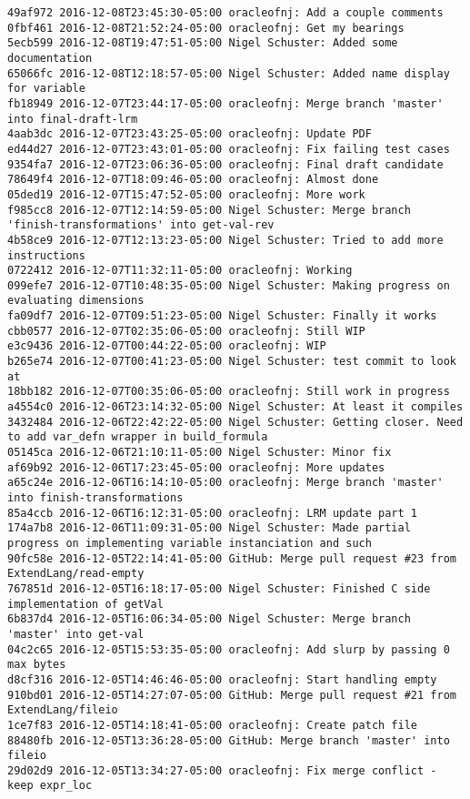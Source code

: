 \begin{lstlisting}
49af972 2016-12-08T23:45:30-05:00 oracleofnj: Add a couple comments
0fbf461 2016-12-08T21:52:24-05:00 oracleofnj: Get my bearings
5ecb599 2016-12-08T19:47:51-05:00 Nigel Schuster: Added some documentation
65066fc 2016-12-08T12:18:57-05:00 Nigel Schuster: Added name display for variable
fb18949 2016-12-07T23:44:17-05:00 oracleofnj: Merge branch 'master' into final-draft-lrm
4aab3dc 2016-12-07T23:43:25-05:00 oracleofnj: Update PDF
ed44d27 2016-12-07T23:43:01-05:00 oracleofnj: Fix failing test cases
9354fa7 2016-12-07T23:06:36-05:00 oracleofnj: Final draft candidate
78649f4 2016-12-07T18:09:46-05:00 oracleofnj: Almost done
05ded19 2016-12-07T15:47:52-05:00 oracleofnj: More work
f985cc8 2016-12-07T12:14:59-05:00 Nigel Schuster: Merge branch 'finish-transformations' into get-val-rev
4b58ce9 2016-12-07T12:13:23-05:00 Nigel Schuster: Tried to add more instructions
0722412 2016-12-07T11:32:11-05:00 oracleofnj: Working
099efe7 2016-12-07T10:48:35-05:00 Nigel Schuster: Making progress on evaluating dimensions
fa09df7 2016-12-07T09:51:23-05:00 Nigel Schuster: Finally it works
cbb0577 2016-12-07T02:35:06-05:00 oracleofnj: Still WIP
e3c9436 2016-12-07T00:44:22-05:00 oracleofnj: WIP
b265e74 2016-12-07T00:41:23-05:00 Nigel Schuster: test commit to look at
18bb182 2016-12-07T00:35:06-05:00 oracleofnj: Still work in progress
a4554c0 2016-12-06T23:14:32-05:00 Nigel Schuster: At least it compiles
3432484 2016-12-06T22:42:22-05:00 Nigel Schuster: Getting closer. Need to add var_defn wrapper in build_formula
05145ca 2016-12-06T21:10:11-05:00 Nigel Schuster: Minor fix
af69b92 2016-12-06T17:23:45-05:00 oracleofnj: More updates
a65c24e 2016-12-06T16:14:10-05:00 oracleofnj: Merge branch 'master' into finish-transformations
85a4ccb 2016-12-06T16:12:31-05:00 oracleofnj: LRM update part 1
174a7b8 2016-12-06T11:09:31-05:00 Nigel Schuster: Made partial progress on implementing variable instanciation and such
90fc58e 2016-12-05T22:14:41-05:00 GitHub: Merge pull request #23 from ExtendLang/read-empty
767851d 2016-12-05T16:18:17-05:00 Nigel Schuster: Finished C side implementation of getVal
6b837d4 2016-12-05T16:06:34-05:00 Nigel Schuster: Merge branch 'master' into get-val
04c2c65 2016-12-05T15:53:35-05:00 oracleofnj: Add slurp by passing 0 max bytes
d8cf316 2016-12-05T14:46:46-05:00 oracleofnj: Start handling empty
910bd01 2016-12-05T14:27:07-05:00 GitHub: Merge pull request #21 from ExtendLang/fileio
1ce7f83 2016-12-05T14:18:41-05:00 oracleofnj: Create patch file
88480fb 2016-12-05T13:36:28-05:00 GitHub: Merge branch 'master' into fileio
29d02d9 2016-12-05T13:34:27-05:00 oracleofnj: Fix merge conflict - keep expr_loc

\end{lstlisting}
